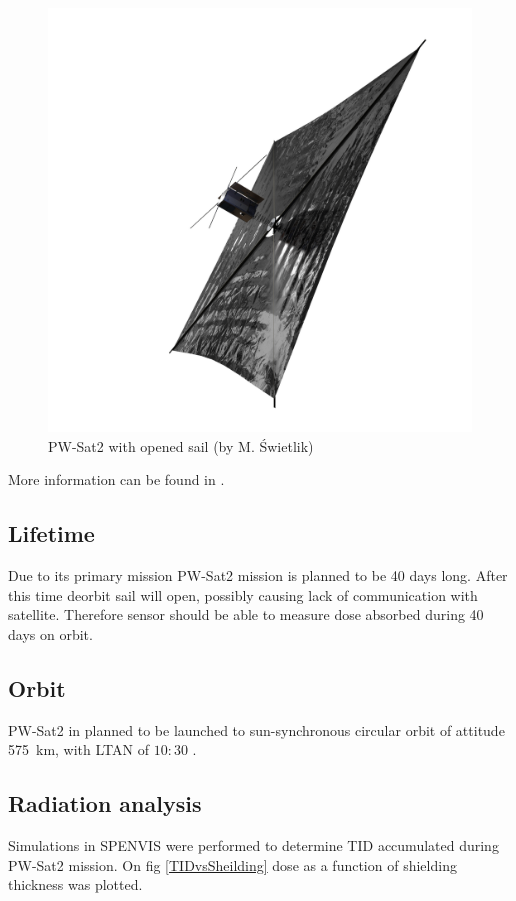 	\begin{figure}[H]
		\centering
		\includegraphics[width=0.7\paperwidth]{img/PW-Sat2_render_02.png}
		\caption{PW-Sat2 with opened sail (by M. Świetlik)}
		\label{PW-Sat_render_sail}
	\end{figure}
	
	More information can be found in \cite{DDC_article}.
	
\subsection{Lifetime}
	Due to its primary mission PW-Sat2 mission is planned to be 40 days long. After this time deorbit sail will open, possibly causing lack of communication with satellite. Therefore sensor should be able to measure dose absorbed during 40 days on orbit.
	
\subsection{Orbit}
	PW-Sat2 in planned to be launched to sun-synchronous circular orbit of attitude \SI{575}{\kilo\meter}, with LTAN of $10:30$ \cite{PWSAT_MA_CDR}.
	

\subsection{Radiation analysis}
	Simulations in SPENVIS \cite{SPENVIS_URL} were performed to determine TID accumulated during PW-Sat2 mission. On fig \ref{TIDvsSheilding} dose as a function of shielding thickness was plotted.

